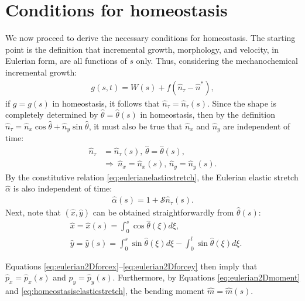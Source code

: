 \section{Conditions for homeostasis}
\label{sec:homeostasisconditions}
We now proceed to derive the necessary conditions for homeostasis. The starting point is the definition that incremental growth, morphology, and velocity, in Eulerian form, are all functions of $s$ only. Thus, considering the mechanochemical incremental growth:
\begin{align}
g(s,t) = W(s) + f(\hat{n}_\tau - \hat{n}^*),\label{eq:homeostasisincgrowth}
\end{align}
if $g=g(s)$ in homeostasis, it follows that $\hat n_\tau=\hat n_\tau(s)$. Since the shape is completely determined by $\hat\theta=\hat\theta(s)$ in homeostasis, then by the definition $\hat n_\tau=\hat n_x\cos\hat\theta+\hat n_y\sin\hat\theta$, it must also be true that $\hat{n}_x$ and $\hat{n}_y$ are independent of time:
\begin{align}
\hat{n}_\tau &= \hat{n}_\tau(s), \,\hat{\theta} = \hat{\theta}(s),\nonumber\\
&\Longrightarrow\ \hat{n}_x = \hat{n}_x(s), \,\hat{n}_y = \hat{n}_y(s).\label{eq:homeostasiselasticstretch}
\end{align}
By the constitutive relation \eqref{eq:eulerianelasticstretch}, the Eulerian elastic stretch $\hat{\alpha}$ is also independent of time:
\begin{align}
\hat{\alpha}(s) = 1 + \mathcal{S}\hat{n}_\tau(s).
\end{align} 
Next, note that $(\hat{x}, \hat{y})$ can be obtained straightforwardly from $\hat\theta(s)$:
\begin{align}
&\hat x=\hat{x}(s) = \int^s_0\cos\hat{\theta}(\xi)d\xi,
\\&\hat y=\hat{y}(s) = \int^s_0\sin\hat{\theta}(\xi)d\xi - \int^l_0\sin\hat{\theta}(\xi)d\xi.\label{eq:homeostasis2Dshape}
\end{align}

Equations \eqref{eq:eulerian2Dforcex}--\eqref{eq:eulerian2Dforcey} then imply that $\hat{p}_x = \hat{p}_x(s)$ and $\hat{p}_y = \hat{p}_y(s)$. Furthermore, by Equations \eqref{eq:eulerian2Dmoment} and \eqref{eq:homeostasiselasticstretch}, the bending moment $\hat{m} = \hat{m}(s)$.

